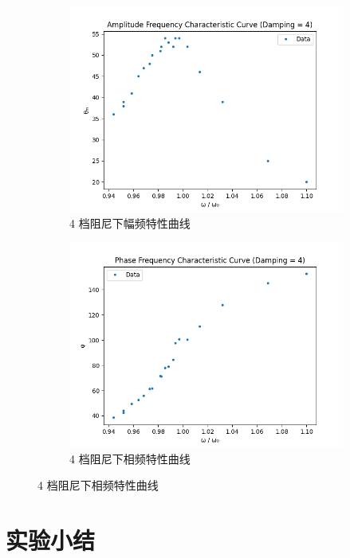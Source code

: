\documentclass[12pt,a4paper]{amsart}
\begin{document}
\begin{figure}[H]
	\begin{subfigure}[b]{0.49\linewidth}
		\centering
		\includegraphics[width=\linewidth]{img/C_2.png}
		\caption{4 档阻尼下幅频特性曲线}
		\label{fig:C_2}
	\end{subfigure}
	\hfill
	\begin{subfigure}[b]{0.49\linewidth}
		\centering
		\includegraphics[width=\linewidth]{img/C_3.png}
		\caption{4 档阻尼下相频特性曲线}
		\label{fig:C_3}
	\end{subfigure}
\end{figure}

\section{实验小结}
\end{document}
